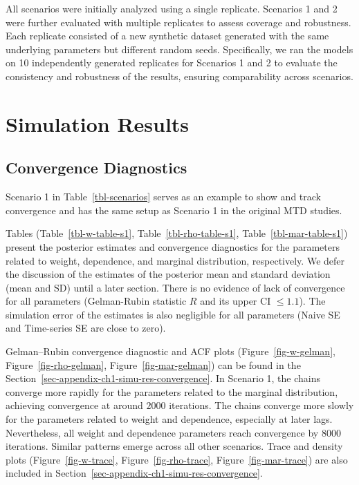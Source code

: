 \documentclass[
  letterpaper,
  double,
  12pt,
  1.0in]{beavtex}
\begin{document}
All scenarios were initially analyzed using a single replicate.
Scenarios 1 and 2 were further evaluated with multiple replicates to
assess coverage and robustness. Each replicate consisted of a new
synthetic dataset generated with the same underlying parameters but
different random seeds. Specifically, we ran the models on 10
independently generated replicates for Scenarios 1 and 2 to evaluate the
consistency and robustness of the results, ensuring comparability across
scenarios.

\section{Simulation Results}\label{sec-ch1-simu-res}

\subsection{Convergence Diagnostics}\label{sec-ch1-simu-res-convergence}

Scenario 1 in Table~\ref{tbl-scenarios} serves as an example to show and
track convergence and has the same setup as Scenario 1 in the original
MTD studies.

Tables (Table~\ref{tbl-w-table-s1}, Table~\ref{tbl-rho-table-s1},
Table~\ref{tbl-mar-table-s1}) present the posterior estimates and
convergence diagnostics for the parameters related to weight,
dependence, and marginal distribution, respectively. We defer the
discussion of the estimates of the posterior mean and standard deviation
(mean and SD) until a later section. There is no evidence of lack of
convergence for all parameters (Gelman-Rubin statistic \(R\) and its
upper CI \(\leq 1.1\)). The simulation error of the estimates is also
negligible for all parameters (Naive SE and Time-series SE are close to
zero).

Gelman--Rubin convergence diagnostic and ACF plots
(Figure~\ref{fig-w-gelman}, Figure~\ref{fig-rho-gelman},
Figure~\ref{fig-mar-gelman}) can be found in the
Section~\ref{sec-appendix-ch1-simu-res-convergence}. In Scenario 1, the
chains converge more rapidly for the parameters related to the marginal
distribution, achieving convergence at around \(2000\) iterations. The
chains converge more slowly for the parameters related to weight and
dependence, especially at later lags. Nevertheless, all weight and
dependence parameters reach convergence by \(8000\) iterations. Similar
patterns emerge across all other scenarios. Trace and density plots
(Figure~\ref{fig-w-trace}, Figure~\ref{fig-rho-trace},
Figure~\ref{fig-mar-trace}) are also included in
Section~\ref{sec-appendix-ch1-simu-res-convergence}.
\end{document}
